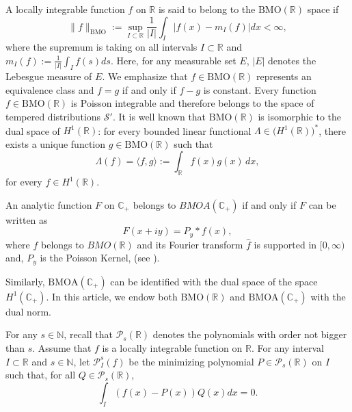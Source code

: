 \documentclass[a4paper,12pt,intlimits,oneside]{amsart}
\theoremstyle{definition}
\numberwithin{equation}{section}
\theoremstyle{definition}
\begin{document}
\medskip

A locally integrable function $f$ on $\mathbb{R}$ is said to belong to the  $\mathrm{BMO}(\mathbb{R})$ space if
\begin{equation}\label{eq:dqtmqaaqa2}
\|f\|_{\mathrm{BMO}}:= \sup_{I \subset \mathbb{R}} \frac{1}{|I|}\int_{I}|f(x)-m_{I}(f)|dx  < \infty,
\end{equation}
where  the supremum is taking on all intervals $I \subset \mathbb{R}$ and  $m_{I}(f):= \frac{1}{|I|}\int_{I}f(s)ds$.  Here, for any
   measurable set $E$, $|E|$ denotes the Lebesgue measure of $E$. We emphasize that \(f\in \mathrm{BMO}(\mathbb{R})\) represents an equivalence class and $f=g$ if and only if $f-g$ is constant. Every function \(f\in \mathrm{BMO}(\mathbb{R})\) is Poisson integrable and therefore belongs to the space of tempered distributions \(\mathcal S'\).   
  It is well known that \(\mathrm{BMO}(\mathbb{R})\) is isomorphic to the dual space of \(H^{1}(\mathbb{R})\): for every bounded linear functional $\Lambda \in \bigl(H^{1}(\mathbb{R})\bigr)^{*}$, there exists a unique function $g\in \mathrm{BMO}(\mathbb{R})$ such that
\[
\Lambda(f)
=
\langle f,g\rangle
:=
\int_{\mathbb{R}}
f(x)g(x)\,dx,
\]
for every \(f\in H^{1}(\mathbb{R})\).

An analytic function $F$ on $\mathbb{C}_{+}$ belongs to  $BMOA(\mathbb{C}_{+})$ if and only if 
 $F$ can be written as
\begin{equation}\label{eq:dqtmqama2}
 F(x+iy) =P_{y}\ast f (x),
\end{equation}
where $f$ belongs to $BMO(\mathbb{R})$ and its Fourier transform \(\hat{f}\) is supported in $[0, \infty)$ and, $P_{y}$ is the Poisson Kernel, (see \cite{BoKy}).

Similarly, \(\mathrm{BMOA}(\mathbb{C}_{+})\) can be identified with the dual space of the  space \(H^{1}(\mathbb{C}_{+})\). In this article, we endow both \(\mathrm{BMO}(\mathbb{R})\) and \(\mathrm{BMOA}(\mathbb{C}_{+})\) with the dual norm.



\medskip

For any $s \in \mathbb{N}$, recall that $\mathcal{P}_{s}(\mathbb{R})$ denotes the polynomials with order not bigger than $s$. Assume that $f$ is a
 locally integrable function on $\mathbb{R}$. For any interval $I \subset  \mathbb{R}$ and  $s \in \mathbb{N}$, let $\mathcal{P}_{I}^{s}(f)$ be the
 minimizing polynomial $P \in \mathcal{P}_{s}(\mathbb{R})$ on $I$ such that, for all $Q \in \mathcal{P}_{s}(\mathbb{R})$, 
$$ \int_{I} (f(x) -P(x))Q(x)dx=0.  $$
\end{document}
